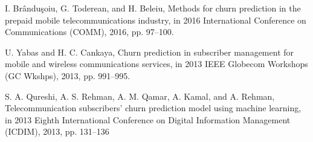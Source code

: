 \documentclass[LaM,binding=0.6cm, english]{sapthesis}
\begin{document}
\begin{thebibliography}{9}
I. Brânduşoiu, G. Toderean, and H. Beleiu, Methods for churn prediction in the prepaid mobile telecommunications industry, in 2016 International Conference on Communications (COMM), 2016, pp. 97–100.

U. Yabas and H. C. Cankaya, Churn prediction in subscriber management for mobile and wireless communications services, in 2013 IEEE Globecom Workshops (GC Wkshps), 2013, pp. 991–995.

S. A. Qureshi, A. S. Rehman, A. M. Qamar, A. Kamal, and A. Rehman, Telecommunication subscribers’ churn prediction model using machine learning, in 2013 Eighth International Conference on Digital Information Management (ICDIM), 2013, pp. 131–136

\end{thebibliography}
\end{document}
